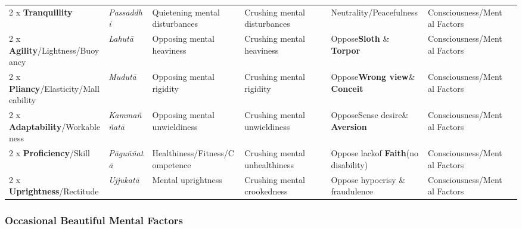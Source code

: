 \documentclass[a4 paper, 12pt]{article}
\begin{document}
\begin{tabular}{P{0.21\textwidth} | C{.13\textwidth} C{.165\textwidth} C{0.165\textwidth} C{0.165\textwidth} C{0.165\textwidth} m{0mm}}
2 x \textbf{Tranquillity} & \textit{Passaddhi} & Quietening mental disturbances & Crushing mental disturbances & Neutrality/\newline Peacefulness & Consciousness/\newline Mental Factors &\\[9mm]
2 x \textbf{Agility}/\newline Lightness/Buoyancy & \textit{Lahutā} & Opposing mental heaviness & Crushing mental heaviness & Oppose\newline \textbf{Sloth} \& \textbf{Torpor} & Consciousness/\newline Mental Factors &\\[9mm]
2 x \textbf{Pliancy}/\newline Elasticity/Malleability & \textit{Mudutā} & Opposing mental rigidity & Crushing mental rigidity & Oppose\newline \textbf{Wrong view}\newline \& \textbf{Conceit} & Consciousness/\newline Mental Factors &\\[9mm]
2 x \textbf{Adaptability}/\newline Workableness & \textit{Kammaññatā} & Opposing mental unwieldiness & Crushing mental unwieldiness & Oppose\newline Sense desire\newline \& \textbf{Aversion} & Consciousness/\newline Mental Factors &\\[9mm]
2 x \textbf{Proficiency}/\newline Skill & \textit{Pāguññatā} & Healthiness/\newline Fitness/\newline Competence & Crushing mental unhealthiness & Oppose lack\newline of \textbf{Faith}\newline (no disability) & Consciousness/\newline Mental Factors &\\[9mm]
2 x \textbf{Uprightness}/\newline Rectitude & \textit{Ujjukatā} & Mental uprightness & Crushing mental crookedness & Oppose hypocrisy \& fraudulence  & Consciousness/\newline Mental Factors &\\[9mm]
\bottomrule
\end{tabular} 

\newpage

\subsubsection*{Occasional Beautiful Mental Factors}
\end{document}

